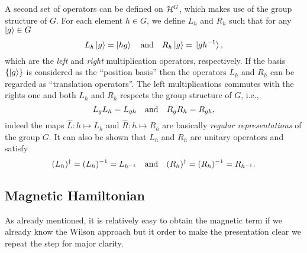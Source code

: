 A second set of operators can be defined on $\mathcal{H}^G$, which makes use of the group structure of $G$.
For each element $h \in G$, we define $L_h$ and $R_h$ such that for any $\ket{g} \in G$
\begin{equation}
    L_h \ket{g} = \ket{hg}
    \qand
    R_h \ket{g} = \ket*{gh^{-1}},
\end{equation}
which are the \emph{left} and \emph{right} multiplication operators, respectively.
If the basis $\{\ket{g}\}$ is considered as the ``position basis'' then the operators $L_h$ and $R_h$ can be regarded as ``translation operators''.
The left multiplications commutes with the rights one and both $L_h$ and $R_h$ respects the group structure of $G$, i.e.,
\begin{equation}
    L_g L_h = L_{gh}
    \qand
    R_g R_h = R_{gh},
\end{equation}
indeed the maps $\hat{L}: h \mapsto L_h$ and $\hat{R}: h \mapsto R_h$ are basically \emph{regular representations} of the group $G$.
It can also be shown that $L_h$ and $R_h$ are unitary operators and satisfy
\begin{equation}
    (L_h)^{\dagger} = (L_h)^{-1} = L_{h^{-1}}
    \qand
    (R_h)^{\dagger} = (R_h)^{-1} = R_{h^{-1}}.
\end{equation}


\subsection{Magnetic Hamiltonian}
\label{sub:magnetic_hamiltonian}

As already mentioned, it is relatively easy to obtain the magnetic term if we already know the Wilson approach but it order to make the presentation clear we repeat the step for major clarity.

